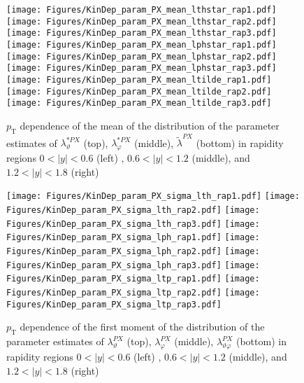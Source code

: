 \documentclass[12pt]{article}
\newcommand{\pT}{p_\mathrm{T}}
\newcommand{\absy}{\left |  y \right |}
\newcommand{\lamthPX}{\lambda^{\scriptscriptstyle PX}_\vartheta}
\newcommand{\lamphPX}{\lambda^{\scriptscriptstyle PX}_\varphi}
\newcommand{\lamthphPX}{\lambda^{\scriptscriptstyle PX}_{\vartheta \varphi}}
\newcommand{\lamtildePX}{\tilde{\lambda}^{\scriptscriptstyle PX}}
\newcommand{\lamthstarPX}{\lambda^{* \scriptscriptstyle PX}_\vartheta}
\newcommand{\lamphstarPX}{\lambda^{* \scriptscriptstyle PX}_\varphi}
\begin{document}
\begin{figure}[htbp]
\centering
\texttt{[image: Figures/KinDep\_param\_PX\_mean\_lthstar\_rap1.pdf]}
\texttt{[image: Figures/KinDep\_param\_PX\_mean\_lthstar\_rap2.pdf]}
\texttt{[image: Figures/KinDep\_param\_PX\_mean\_lthstar\_rap3.pdf]}
\texttt{[image: Figures/KinDep\_param\_PX\_mean\_lphstar\_rap1.pdf]}
\texttt{[image: Figures/KinDep\_param\_PX\_mean\_lphstar\_rap2.pdf]}
\texttt{[image: Figures/KinDep\_param\_PX\_mean\_lphstar\_rap3.pdf]}
\texttt{[image: Figures/KinDep\_param\_PX\_mean\_ltilde\_rap1.pdf]}
\texttt{[image: Figures/KinDep\_param\_PX\_mean\_ltilde\_rap2.pdf]}
\texttt{[image: Figures/KinDep\_param\_PX\_mean\_ltilde\_rap3.pdf]}
\caption{$\pT$ dependence of the mean of the distribution of the parameter estimates of $\lamthstarPX$ (top), $\lamphstarPX$ (middle), $\lamtildePX$ (bottom) in rapidity regions $0<\absy<0.6$ (left) , $0.6<\absy<1.2$ (middle), and $1.2<\absy<1.8$ (right)}
\end{figure}
\clearpage


\begin{figure}[htbp]
\centering
\texttt{[image: Figures/KinDep\_param\_PX\_sigma\_lth\_rap1.pdf]}
\texttt{[image: Figures/KinDep\_param\_PX\_sigma\_lth\_rap2.pdf]}
\texttt{[image: Figures/KinDep\_param\_PX\_sigma\_lth\_rap3.pdf]}
\texttt{[image: Figures/KinDep\_param\_PX\_sigma\_lph\_rap1.pdf]}
\texttt{[image: Figures/KinDep\_param\_PX\_sigma\_lph\_rap2.pdf]}
\texttt{[image: Figures/KinDep\_param\_PX\_sigma\_lph\_rap3.pdf]}
\texttt{[image: Figures/KinDep\_param\_PX\_sigma\_ltp\_rap1.pdf]}
\texttt{[image: Figures/KinDep\_param\_PX\_sigma\_ltp\_rap2.pdf]}
\texttt{[image: Figures/KinDep\_param\_PX\_sigma\_ltp\_rap3.pdf]}
\caption{$\pT$ dependence of the first moment of the distribution of the parameter estimates of $\lamthPX$ (top), $\lamphPX$ (middle), $\lamthphPX$ (bottom) in rapidity regions $0<\absy<0.6$ (left) , $0.6<\absy<1.2$ (middle), and $1.2<\absy<1.8$ (right)}
\end{figure}
\clearpage
\end{document}
